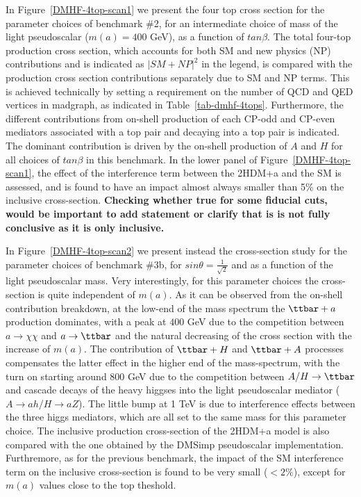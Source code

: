 In Figure~\ref{DMHF-4top-scan1} we present the four top cross section
for the parameter choices of benchmark \#2, for an intermediate choice
of mass of the light pseudoscalar ($m(a) = 400$ GeV), as a function of
$tan\beta$. The total four-top production cross section, which
accounts for both SM and new physics (NP) contributions and is indicated
as $|SM+NP|^2$ in the legend, is compared with the production cross
section contributions separately due to SM and NP terms. 
This is achieved technically by setting a requirement on the number of
QCD and QED vertices in madgraph, as indicated in Table~\ref{tab-dmhf-4tops}.
Furthermore, the different contributions from on-shell production of
each CP-odd and CP-even mediators associated with a top pair and
decaying into a top pair is indicated. The dominant contribution is
driven by the on-shell production of $A$ and $H$ for all choices of
$tan\beta$ in this benchmark. 
In the lower panel of Figure~\ref{DMHF-4top-scan1}, the effect of the
interference term between the 2HDM+a and the SM is assessed, and is
found to have an impact almost always smaller than 5\% on the
inclusive cross-section. \textbf{Checking whether true for some
fiducial cuts, would be important to add statement or clarify that is
is not fully conclusive as it is only inclusive.}

In Figure~\ref{DMHF-4top-scan2} we present instead the cross-section
study for the parameter choices of benchmark \#3b, for $sin\theta
= \frac{1}{\sqrt{2}}$ and as a function of the light pseudoscalar mass. 
Very interestingly, for this parameter choices the cross-section is
quite independent of $m(a)$. As it can
be observed from the on-shell contribution breakdown, at the
low-end of the mass spectrum the $\ttbar+a$ production dominates, with a
peak at $400$ GeV due to the competition between
$a\rightarrow \chi\chi$ and $a\rightarrow \ttbar$ and the natural
decreasing of the cross section with the increase of $m(a)$.  The contribution of
$\ttbar+H$ and $\ttbar+A$ processes compensates the latter effect in
the higher end of the mass-spectrum, with the turn on starting around
$800$ GeV due to the competition between $A/H\rightarrow\ttbar$ and
cascade decays of the heavy higgses into the light pseudoscalar
mediator ($A\rightarrow ah/H\rightarrow aZ$). 
The little bump at 1 TeV is due to interference effects between the
three higgs mediators, which are all set to the
same mass for this parameter choice.  
The inclusive production cross-section of the 2HDM+a
model is also compared with the one obtained by the DMSimp pseudoscalar
implementation. Furthremore, as for the previous benchmark,  the impact of the SM interference
term on the inclusive cross-section is found to be very small
($<2\%$), except for $m(a)$ values close to the top theshold. 

